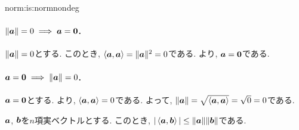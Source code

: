 \begin{proofof*}{norm:is:norm}{nondeg}
  \paragraph{$\|\aaa\|=0\implies\aaa=\zzero$.}
  $\|\aaa\|=0$とする.
  このとき, $\Braket{\aaa,\aaa}=\|\aaa\|^2=0$である.
  より, $\aaa=\zzero$である.
  \paragraph{$\aaa=\zzero\implies\|\aaa\|=0$.}
  $\aaa=\zzero$とする.
  より, $\Braket{\aaa,\aaa}=0$である.
  よって, $\|\aaa\|=\sqrt{\Braket{\aaa,\aaa}}=\sqrt0=0$である.
\end{proofof*}

\begin{lemma}
  \label{lem:csi}
  $\aaa$, $\bbb$を$n$項実ベクトルとする.
  このとき, $|\Braket{\aaa,\bbb}|\leq \|\aaa\|\|\bbb\|$である.
\end{lemma}

